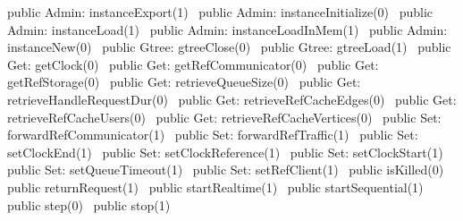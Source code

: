 public \LA{}Admin: instanceExport(1)~{\nwtagstyle{}}\RA{}
public \LA{}Admin: instanceInitialize(0)~{\nwtagstyle{}}\RA{}
public \LA{}Admin: instanceLoad(1)~{\nwtagstyle{}}\RA{}
public \LA{}Admin: instanceLoadInMem(1)~{\nwtagstyle{}}\RA{}
public \LA{}Admin: instanceNew(0)~{\nwtagstyle{}}\RA{}
public \LA{}Gtree: gtreeClose(0)~{\nwtagstyle{}}\RA{}
public \LA{}Gtree: gtreeLoad(1)~{\nwtagstyle{}}\RA{}
public \LA{}Get: getClock(0)~{\nwtagstyle{}}\RA{}
public \LA{}Get: getRefCommunicator(0)~{\nwtagstyle{}}\RA{}
public \LA{}Get: getRefStorage(0)~{\nwtagstyle{}}\RA{}
public \LA{}Get: retrieveQueueSize(0)~{\nwtagstyle{}}\RA{}
public \LA{}Get: retrieveHandleRequestDur(0)~{\nwtagstyle{}}\RA{}
public \LA{}Get: retrieveRefCacheEdges(0)~{\nwtagstyle{}}\RA{}
public \LA{}Get: retrieveRefCacheUsers(0)~{\nwtagstyle{}}\RA{}
public \LA{}Get: retrieveRefCacheVertices(0)~{\nwtagstyle{}}\RA{}
public \LA{}Set: forwardRefCommunicator(1)~{\nwtagstyle{}}\RA{}
public \LA{}Set: forwardRefTraffic(1)~{\nwtagstyle{}}\RA{}
public \LA{}Set: setClockEnd(1)~{\nwtagstyle{}}\RA{}
public \LA{}Set: setClockReference(1)~{\nwtagstyle{}}\RA{}
public \LA{}Set: setClockStart(1)~{\nwtagstyle{}}\RA{}
public \LA{}Set: setQueueTimeout(1)~{\nwtagstyle{}}\RA{}
public \LA{}Set: setRefClient(1)~{\nwtagstyle{}}\RA{}
public \LA{}isKilled(0)~{\nwtagstyle{}}\RA{}
public \LA{}returnRequest(1)~{\nwtagstyle{}}\RA{}
public \LA{}startRealtime(1)~{\nwtagstyle{}}\RA{}
public \LA{}startSequential(1)~{\nwtagstyle{}}\RA{}
public \LA{}step(0)~{\nwtagstyle{}}\RA{}
public \LA{}stop(1)~{\nwtagstyle{}}\RA{}
\nwendcode{}\nwdocspar

